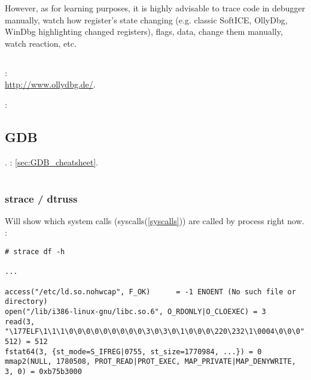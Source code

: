 {However, as for learning purposes, it is highly advisable to trace code in debugger manually, watch how register's state
changing (e.g. classic SoftICE, OllyDbg, WinDbg highlighting changed registers), flags, data, change them
manually, watch reaction, etc.}

\section{\olly}
\index{\olly}

:\\
\url{http://www.ollydbg.de/}.

\ShortHotKeyCheatsheet: \label{sec:Olly_cheatsheet}

\section{GDB}

.
: \ref{sec:GDB_cheatsheet}.

\chapter{}

\label{strace}
\subsection{strace / dtruss}

{Will show which system calls (syscalls(\ref{syscalls})) are called by process right now}.
:

\begin{lstlisting}
# strace df -h

...

access("/etc/ld.so.nohwcap", F_OK)      = -1 ENOENT (No such file or directory)
open("/lib/i386-linux-gnu/libc.so.6", O_RDONLY|O_CLOEXEC) = 3
read(3, "\177ELF\1\1\1\0\0\0\0\0\0\0\0\0\3\0\3\0\1\0\0\0\220\232\1\0004\0\0\0"..., 512) = 512
fstat64(3, {st_mode=S_IFREG|0755, st_size=1770984, ...}) = 0
mmap2(NULL, 1780508, PROT_READ|PROT_EXEC, MAP_PRIVATE|MAP_DENYWRITE, 3, 0) = 0xb75b3000
\end{lstlisting}

